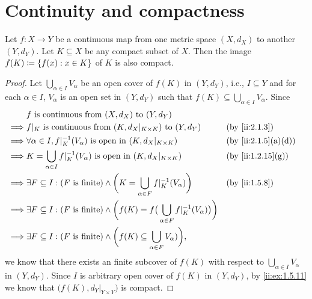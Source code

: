 \section{Continuity and compactness}\label{ii:sec:2.3}

\begin{thm}\label{ii:2.3.1}
  Let \(f : X \to Y\) be a continuous map from one metric space \((X, d_X)\) to another \((Y, d_Y)\).
  Let \(K \subseteq X\) be any compact subset of \(X\).
  Then the image \(f(K) \coloneqq \left\lbrace f(x) : x \in K\right\rbrace\) of \(K\) is also compact.
\end{thm}

\begin{proof}
  Let \(\bigcup_{\alpha \in I} V_\alpha\) be an open cover of \(f(K)\) in \((Y, d_Y)\), i.e., \(I \subseteq Y\) and for each \(\alpha \in I\), \(V_{\alpha}\) is an open set in \((Y, d_Y)\) such that \(f(K) \subseteq \bigcup_{\alpha \in I} V_\alpha\).
  Since
  \begin{align*}
             & f \text{ is continuous from } (X, d_X) \text{ to } (Y, d_Y)                                                                                       \\
    \implies & f|_K \text{ is continuous from } (K, d_X|_{K \times K}) \text{ to } (Y, d_Y)                                                 &  & \by{ii:2.1.3}      \\
    \implies & \forall \alpha \in I, f|_K^{-1}(V_\alpha) \text{ is open in } (K, d_X|_{K \times K})                                         &  & \by{ii:2.1.5}[a,d] \\
    \implies & K = \bigcup_{\alpha \in I} f|_K^{-1}(V_\alpha) \text{ is open in } (K, d_X|_{K \times K})                                    &  & \by{ii:1.2.15}[g]  \\
    \implies & \exists F \subseteq I : (F \text{ is finite}) \land \bigg(K = \bigcup_{\alpha \in F} f|_K^{-1}(V_\alpha)\bigg)               &  & \by{ii:1.5.8}      \\
    \implies & \exists F \subseteq I : (F \text{ is finite}) \land \bigg(f(K) = f\big(\bigcup_{\alpha \in F} f|_K^{-1}(V_\alpha)\big)\bigg)                      \\
    \implies & \exists F \subseteq I : (F \text{ is finite}) \land \bigg(f(K) \subseteq \bigcup_{\alpha \in F} V_\alpha)\bigg),
  \end{align*}
  we know that there exists an finite subcover of \(f(K)\) with respect to \(\bigcup_{\alpha \in I} V_\alpha\) in \((Y, d_Y)\).
  Since \(I\) is arbitrary open cover of \(f(K)\) in \((Y, d_Y)\), by \cref{ii:ex:1.5.11} we know that \(\big(f(K), d_Y|_{Y \times Y}\big)\) is compact.
\end{proof}

